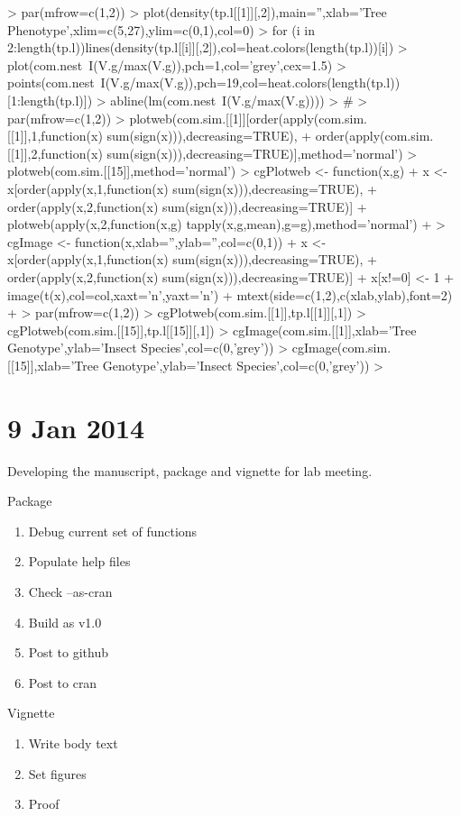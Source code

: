 \documentclass[12pt]{article}
\begin{document}
\begin{Schunk}
\begin{Sinput}
> par(mfrow=c(1,2))
> plot(density(tp.l[[1]][,2]),main='',xlab='Tree Phenotype',xlim=c(5,27),ylim=c(0,1),col=0)
> for (i in 2:length(tp.l)){lines(density(tp.l[[i]][,2]),col=heat.colors(length(tp.l))[i])}
> plot(com.nest~I(V.g/max(V.g)),pch=1,col='grey',cex=1.5)
> points(com.nest~I(V.g/max(V.g)),pch=19,col=heat.colors(length(tp.l))[1:length(tp.l)])
> abline(lm(com.nest~I(V.g/max(V.g))))
>                                         #
> par(mfrow=c(1,2))
> plotweb(com.sim.[[1]][order(apply(com.sim.[[1]],1,function(x) sum(sign(x))),decreasing=TRUE),
+                       order(apply(com.sim.[[1]],2,function(x) sum(sign(x))),decreasing=TRUE)],method='normal')
> plotweb(com.sim.[[15]],method='normal')
> cgPlotweb <- function(x,g){
+   x <- x[order(apply(x,1,function(x) sum(sign(x))),decreasing=TRUE),
+            order(apply(x,2,function(x) sum(sign(x))),decreasing=TRUE)]
+   plotweb(apply(x,2,function(x,g) tapply(x,g,mean),g=g),method='normal')
+ }
> cgImage <- function(x,xlab='',ylab='',col=c(0,1)){
+   x <- x[order(apply(x,1,function(x) sum(sign(x))),decreasing=TRUE),
+          order(apply(x,2,function(x) sum(sign(x))),decreasing=TRUE)]
+   x[x!=0] <- 1
+   image(t(x),col=col,xaxt='n',yaxt='n')
+   mtext(side=c(1,2),c(xlab,ylab),font=2)
+ }
> par(mfrow=c(1,2))
> cgPlotweb(com.sim.[[1]],tp.l[[1]][,1])
> cgPlotweb(com.sim.[[15]],tp.l[[15]][,1])
> cgImage(com.sim.[[1]],xlab='Tree Genotype',ylab='Insect Species',col=c(0,'grey'))
> cgImage(com.sim.[[15]],xlab='Tree Genotype',ylab='Insect Species',col=c(0,'grey'))
> 
\end{Sinput}
\end{Schunk}

\section{9 Jan 2014}
Developing the manuscript, package and vignette for lab meeting. 

Package
\begin{enumerate}
\item Debug current set of functions
\item Populate help files
\item Check --as-cran
\item Build as v1.0
\item Post to github
\item Post to cran
\end{enumerate}

Vignette
\begin{enumerate}
\item Write body text
\item Set figures
\item Proof
\end{enumerate}
\end{document}
